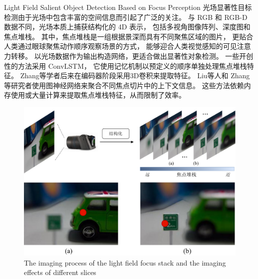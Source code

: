 %
%
%
%
%
%
%
%




{Light Field Salient Object Detection Based on Focus Perception}
\label{chap:part3}
%
%
光场显著性目标检测由于光场中包含丰富的空间信息而引起了广泛的关注。
与 RGB
和 RGB-D
数据不同，光场本质上捕获结构化的 4D 表示，
包括多视角图像阵列、深度图和焦点堆栈。 
其中，焦点堆栈是一组根据景深而具有不同聚焦区域的图片，
更贴合人类通过眼球聚焦动作顺序观察场景的方式，
能够迎合人类视觉感知的可见注意力转移。
以光场数据作为输出构造网络，更适合做出显著性对象检测。
%
%
%
%
一些开创性的方法采用 ConvLSTM，
它使用记忆机制以预定义的顺序单独处理焦点堆栈特征。
Zhang等学者后来在编码器阶段采用3D卷积来提取特征。
Liu等人和
Zhang等研究者使用图神经网络来聚合不同焦点切片中的上下文信息。 
这些方法依赖内存使用或大量计算来提取焦点堆栈特征，从而限制了效率。
\begin{figure}[!ht]
	\centering
	\includegraphics[width=0.85\linewidth]{figures/chapter3/cpt3_idea.pdf}
	{The imaging process of the light field focus stack and the imaging effects of different slices}
	\label{figure:cpt3:idea}
\end{figure}
